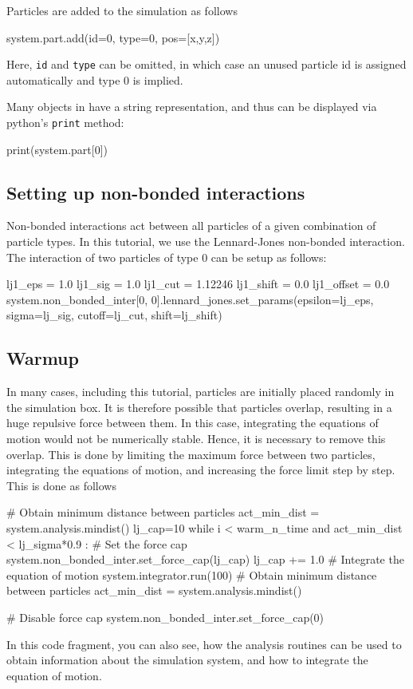 \documentclass[
paper=a4,                       %
fontsize=11pt,                  %
twoside,                        %
footsepline,                    %
headsepline,                    %
headinclude=false,              %
footinclude=false,              %
pagesize,                       %
]{scrartcl}
\begin{document}
Particles are added to the simulation as follows
\begin{pypresso}
system.part.add(id=0, type=0, pos=[x,y,z])
\end{pypresso}\vspace{0,2cm}
Here, \texttt{id} and \texttt{type} can be omitted, in which case an unused particle
id is assigned automatically and type 0 is implied.

Many objects in \es{} have a string representation, and thus can be displayed via python's \texttt{print} method:
\begin{pypresso}
print(system.part[0])
\end{pypresso}\vspace{0,2cm}


\subsection{Setting up non-bonded interactions}

Non-bonded interactions act between all particles of a given combination of particle types.
In this tutorial, we use the Lennard-Jones non-bonded interaction.
The interaction of two particles of type 0 can be setup as follows:
{\small\vspace{0,2cm}
\begin{pypresso}
lj1_eps     = 1.0
lj1_sig     = 1.0
lj1_cut     = 1.12246
lj1_shift   = 0.0
lj1_offset  = 0.0
system.non_bonded_inter[0, 0].lennard_jones.set_params(epsilon=lj_eps, sigma=lj_sig,
cutoff=lj_cut, shift=lj_shift)
\end{pypresso}
}\vspace{0,2cm}


\subsection{Warmup}

In many cases, including this tutorial, particles are initially placed randomly in the simulation box. It is therefore possible that particles overlap, resulting in a huge repulsive force between them. In this case, integrating the equations of motion would not be numerically stable. Hence, it is necessary to remove this overlap.
This is done by limiting the maximum force between two particles, integrating the equations of motion, and increasing the force limit step by step.
This is done as follows
\begin{pypresso}
# Obtain minimum distance between particles
act_min_dist = system.analysis.mindist()
lj_cap=10
while i < warm_n_time and act_min_dist < lj_sigma*0.9 :
    # Set the force cap
    system.non_bonded_inter.set_force_cap(lj_cap)
    lj_cap += 1.0
    # Integrate the equation of motion
    system.integrator.run(100)
    # Obtain minimum distance between particles
    act_min_dist = system.analysis.mindist()

# Disable force cap
system.non_bonded_inter.set_force_cap(0)
\end{pypresso}
In this code fragment, you can also see, how the analysis routines can be used to obtain information about the simulation system, and how to integrate the equation of motion.
\end{document}
